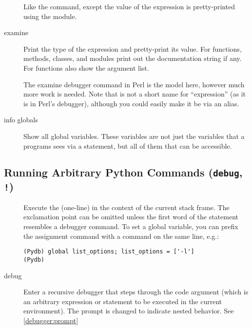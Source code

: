\begin{description}
Like the  command, except the value of the expression is
pretty-printed using the  module.

\item[examine \var{expression}]

Print the type of the expression and pretty-print its value.  For
functions, methods, classes, and modules print out the documentation
string if any.  For functions also show the argument list.

The examine debugger command in Perl is the model here, however much
more work is needed. Note that  is not a short name for
``expression'' (as it is in Perl's debugger), although you could
easily make it be via an alias.

\item[info globals]\label{command:info-globals}

Show all global variables. These variables are not just the variables
that a programs sees via a  statement, but all of them
that can be accessible.

\end{description}

\subsection{Running Arbitrary Python Commands ({\tt debug}, {\tt !})\label{subsection-commands}}

\begin{description}

\item[\optional{!}]

Execute the (one-line)  in the context of
the current stack frame.
The exclamation point can be omitted unless the first word
of the statement resembles a debugger command.
To set a global variable, you can prefix the assignment
command with a  command on the same line, e.g.:

\begin{verbatim}
(Pydb) global list_options; list_options = ['-l']
(Pydb)
\end{verbatim}

\item[debug ]

Enter a recursive debugger that steps through the code argument (which
is an arbitrary expression or statement to be executed in the current
environment). The prompt is changed to indicate nested behavior. See
\ref{debugger:prompt}

\end{description}

